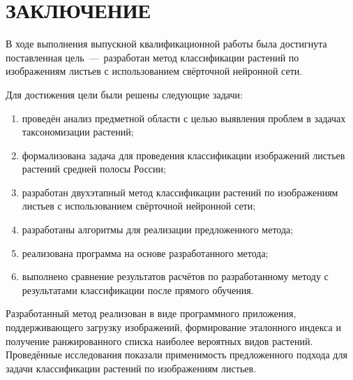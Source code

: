 \chapter*{ЗАКЛЮЧЕНИЕ}

В ходе выполнения выпускной квалификационной работы была достигнута поставленная цель~---~разработан метод классификации растений по изображениям листьев с использованием свёрточной нейронной сети.

Для достижения цели были решены следующие задачи:
\begin{enumerate}[itemsep=0pt, parsep=0pt, topsep=0pt]
	\item проведён анализ предметной области с целью выявления проблем в задачах таксономизации растений;
	\item формализована задача для проведения классификации изображений листьев растений средней полосы России;
	\item разработан двухэтапный метод классификации растений по изображениям листьев с использованием свёрточной нейронной сети;
	\item разработаны алгоритмы для реализации предложенного метода;
	\item реализована программа на основе разработанного метода;
	\item выполнено сравнение результатов расчётов по разработанному методу с результатами классификации после прямого обучения.
\end{enumerate}

Разработанный метод реализован в виде программного приложения, поддерживающего загрузку изображений, формирование эталонного индекса и получение ранжированного списка наиболее вероятных видов растений. Проведённые исследования показали применимость предложенного подхода для задачи классификации растений по изображениям листьев.
